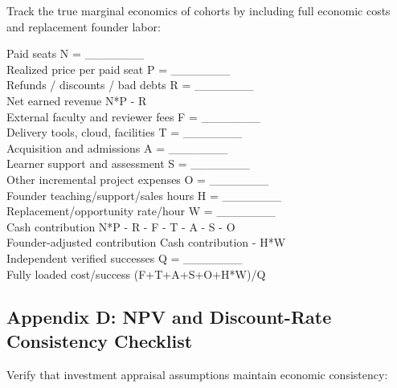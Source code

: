 Track the true marginal economics of cohorts by including full economic costs and replacement founder labor:

\begin{tcolorbox}[colback=BayesCanvas,colframe=BayesDark,arc=1mm,title=\textbf{Appendix C: Founder-Adjusted Cohort Economics Worksheet}]
\scriptsize\ttfamily
Paid seats                           N = \_\_\_\_\_\_\_\\
Realized price per paid seat         P = \_\_\_\_\_\_\_\\
Refunds / discounts / bad debts      R = \_\_\_\_\_\_\_\\
Net earned revenue                   N*P - R\\
External faculty and reviewer fees   F = \_\_\_\_\_\_\_\\
Delivery tools, cloud, facilities    T = \_\_\_\_\_\_\_\\
Acquisition and admissions           A = \_\_\_\_\_\_\_\\
Learner support and assessment       S = \_\_\_\_\_\_\_\\
Other incremental project expenses   O = \_\_\_\_\_\_\_\\
Founder teaching/support/sales hours H = \_\_\_\_\_\_\_\\
Replacement/opportunity rate/hour    W = \_\_\_\_\_\_\_\\
Cash contribution                    N*P - R - F - T - A - S - O\\
Founder-adjusted contribution        Cash contribution - H*W\\
Independent verified successes       Q = \_\_\_\_\_\_\_\\
Fully loaded cost/success            (F+T+A+S+O+H*W)/Q
\end{tcolorbox}

\subsection{Appendix D: NPV and Discount-Rate Consistency Checklist}

Verify that investment appraisal assumptions maintain economic consistency:


